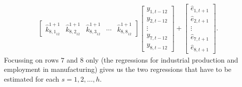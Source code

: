\documentclass[a4paper,11pt,listof=nochaptergap,oneside,pointednumbers,bibtotoc,bigheadings,liststotoc]{scrbook}
\theoremstyle{mysatz}
\theoremstyle{mydefinition}
\theoremstyle{mybemerkung}
\let\oldhat\hat
\newcommand{\hattnobf}[1]{\oldhat{#1}}
\begin{document}
\begin{itemize}
\begin{enumerate}
\begin{equation}
\begin{split}
\begin{bmatrix}
		{\hattnobf{k}_{{8, 1}_{12}}^{1+1}} & {\hattnobf{k}_{{8, 2}_{12}}^{1+1}} & {\hattnobf{k}_{{8, 3}_{12}}^{1+1}} & \cdots & {\hattnobf{k}_{{8, 8}_{12}}^{1+1}}
 		\end{bmatrix} 
		\begin{bmatrix}
    		y_{1,t-12} \\
    		y_{2,t-12} \\
		\vdots \\
		y_{7, t-12} \\
		y_{8, t-12}
 		\end{bmatrix} + 
		\begin{bmatrix}
    		\hattnobf{e}_{1, t+1} \\
    		\hattnobf{e}_{2, t+1} \\
		\vdots \\
		\hattnobf{e}_{7, t+1} \\
		\hattnobf{e}_{8, t+1}
 		\end{bmatrix}. 
\end{split}								
\end{equation}
Focussing on rows $7$ and $8$ only (the regressions for industrial production and employment in manufacturing) gives us the two regressions that have to be estimated for each $s = 1, 2, \dots, h$.


\end{enumerate}
\end{itemize}
\end{document}
